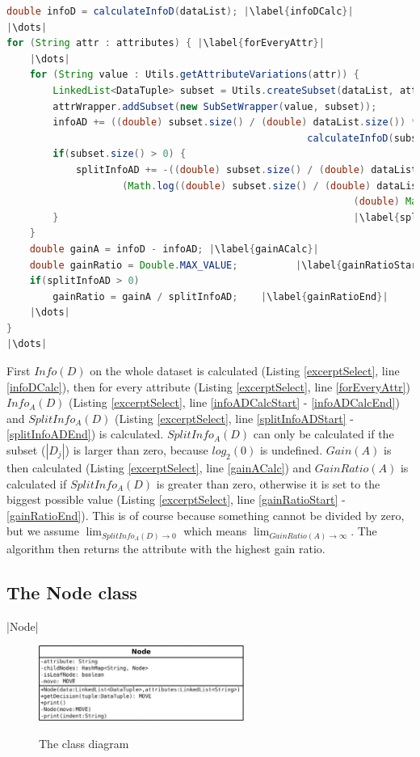 \documentclass{article}
\begin{document}
    \begin{lstlisting}[language=Java, caption=Excerpt from \protect\UseVerb{term}, label={excerptSelect}, escapechar=|]
double infoD = calculateInfoD(dataList); |\label{infoDCalc}|
|\dots|
for (String attr : attributes) { |\label{forEveryAttr}|
    |\dots|
    for (String value : Utils.getAttributeVariations(attr)) {
        LinkedList<DataTuple> subset = Utils.createSubset(dataList, attr, value); |\label{infoADCalcStart}|
        attrWrapper.addSubset(new SubSetWrapper(value, subset));
        infoAD += ((double) subset.size() / (double) dataList.size()) *
                                                    calculateInfoD(subset); |\label{infoADCalcEnd}|
        if(subset.size() > 0) {                                             |\label{splitInfoADStart}|
            splitInfoAD += -((double) subset.size() / (double) dataList.size()) *
                    (Math.log((double) subset.size() / (double) dataList.size()) /
                                                            (double) Math.log(2));
        }                                                   |\label{splitInfoADEnd}|
    }
    double gainA = infoD - infoAD; |\label{gainACalc}|
    double gainRatio = Double.MAX_VALUE;          |\label{gainRatioStart}|
    if(splitInfoAD > 0)
        gainRatio = gainA / splitInfoAD;    |\label{gainRatioEnd}|
    |\dots|
}
|\dots|\end{lstlisting}
    First $Info(D)$ on the whole dataset is calculated (Listing \ref{excerptSelect}, line \ref{infoDCalc}), then for every attribute (Listing \ref{excerptSelect}, line \ref{forEveryAttr}) $Info_A (D)$ (Listing \ref{excerptSelect}, line \ref{infoADCalcStart} - \ref{infoADCalcEnd}) and $SplitInfo_A (D)$ (Listing \ref{excerptSelect}, line \ref{splitInfoADStart} - \ref{splitInfoADEnd}) is calculated. $SplitInfo_A (D)$ can only be calculated if the subset ($|D_j|$) is larger than zero, because $log_2 (0)$ is undefined.
    $Gain(A)$ is then calculated (Listing \ref{excerptSelect}, line \ref{gainACalc}) and $GainRatio(A)$ is calculated if $SplitInfo_A (D)$ is greater than zero, otherwise it is set to the biggest possible value  (Listing \ref{excerptSelect}, line \ref{gainRatioStart} - \ref{gainRatioEnd}). This is of course because something cannot be divided by zero, but we assume \(\lim_{SplitInfo_A (D) \to 0}\) which means  \(\lim_{GainRatio(A) \to \infty}\).
    The algorithm then returns the attribute with the highest gain ratio.

    \subsection{The Node class}
    |Node|
    \begin{figure}
        \caption{The \protect{} class diagram}
        \includegraphics[width=0.6\textwidth]{DiagramNode}
        \label{nodeClassDiag}
    \end{figure}
\end{document}
